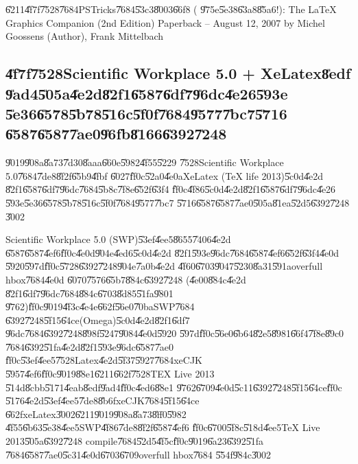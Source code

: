 \bigskip

\U{6211}\U{4f7f}\U{7528}\U{7684}PSTricks\U{7684}\U{53c3}\U{8003}\U{66f8} (%
\U{975e}\U{5e38}\U{63a8}\U{85a6}!): The LaTeX Graphics Companion (2nd
Edition) Paperback -- August 12, 2007 by Michel Goossens (Author), Frank
Mittelbach

\bigskip

\subsection{\U{4f7f}\U{7528}Scientific Workplace 5.0 + XeLatex\U{8edf}%
\U{9ad4}\U{505a}\U{4e2d}\U{82f1}\U{6587}\U{6df7}\U{96dc}\U{4e26}\U{593e}%
\U{5e36}\U{6578}\U{5b78}\U{516c}\U{5f0f}\U{7684}\U{9577}\U{7bc7}\U{5716}%
\U{6587}\U{6587}\U{7ae0}\U{96fb}\U{8166}\U{6392}\U{7248}}

\U{9019}\U{908a}\U{8a73}\U{7d30}\U{8aaa}\U{660e}\U{5982}\U{4f55}\U{5229}%
\U{7528}Scientific Workplace 5.0\U{7684}\U{7de8}\U{8f2f}\U{65b9}\U{4fbf}%
\U{6027}\U{ff0c}\U{52a0}\U{4e0a}XeLatex (TeX life 2013)\U{5c0d}\U{4e2d}%
\U{82f1}\U{6587}\U{6df7}\U{96dc}\U{7684}\U{5b8c}\U{7f8e}\U{652f}\U{63f4}%
\U{ff0c}\U{4f86}\U{5c0d}\U{4e2d}\U{82f1}\U{6587}\U{6df7}\U{96dc}\U{4e26}%
\U{593e}\U{5e36}\U{6578}\U{5b78}\U{516c}\U{5f0f}\U{7684}\U{9577}\U{7bc7}%
\U{5716}\U{6587}\U{6587}\U{7ae0}\U{505a}\U{81ea}\U{52d5}\U{6392}\U{7248}%
\U{3002}

Scientific Workplace 5.0 (SWP)\U{53ef}\U{4ee5}\U{8655}\U{7406}\U{4e2d}%
\U{6587}\U{6587}\U{4ef6}\U{ff0c}\U{4e0d}\U{904e}\U{4ed6}\U{5c0d}\U{4e2d}%
\U{82f1}\U{593e}\U{96dc}\U{7684}\U{6587}\U{4ef6}\U{652f}\U{63f4}\U{4e0d}%
\U{5920}\U{597d}\U{ff0c}\U{5728}\U{6392}\U{7248}\U{904e}\U{7a0b}\U{4e2d}%
\U{4f60}\U{6703}\U{9047}\U{5230}\U{8a31}\U{591a}overfull hbox\U{7684}\U{4e0d}%
\U{6070}\U{7576}\U{65b7}\U{884c}\U{6392}\U{7248} (\U{4e00}\U{884c}\U{4e2d}%
\U{82f1}\U{6df7}\U{96dc}\U{7684}\U{884c}\U{6703}\U{8d85}\U{51fa}\U{9801}%
\U{9762})\U{ff0c}\U{9019}\U{4f3c}\U{4e4e}\U{662f}\U{56e0}\U{70ba}SWP\U{7684}%
\U{6392}\U{7248}\U{5f15}\U{64ce}(Omega)\U{5c0d}\U{4e2d}\U{82f1}\U{6df7}%
\U{96dc}\U{7684}\U{6392}\U{7248}\U{898f}\U{5247}\U{9084}\U{4e0d}\U{5920}%
\U{597d}\U{ff0c}\U{56e0}\U{6b64}\U{82e5}\U{8981}\U{66f4}\U{7f8e}\U{89c0}%
\U{7684}\U{6392}\U{51fa}\U{4e2d}\U{82f1}\U{593e}\U{96dc}\U{6587}\U{7ae0}%
\U{ff0c}\U{53ef}\U{4ee5}\U{7528}Latex\U{4e2d}\U{5f37}\U{5927}\U{7684}xeCJK%
\U{5957}\U{4ef6}\U{ff0c}\U{9019}\U{88e1}\U{6211}\U{662f}\U{7528}TEX Live 2013%
\U{514d}\U{8cbb}\U{5171}\U{4eab}\U{8edf}\U{9ad4}\U{ff0c}\U{4ed6}\U{88e1}%
\U{9762}\U{6709}\U{4e0d}\U{5c11}\U{6392}\U{7248}\U{5f15}\U{64ce}\U{ff0c}%
\U{5176}\U{4e2d}\U{53ef}\U{4ee5}\U{7de8}\U{8b6f}xeCJK\U{7684}\U{5f15}\U{64ce}%
\U{662f}xeLatex\U{3002}\U{6211}\U{9019}\U{908a}\U{8a73}\U{8ff0}\U{5982}%
\U{4f55}\U{6b63}\U{5e38}\U{4ee5}SWP\U{4f86}\U{7de8}\U{8f2f}\U{6587}\U{4ef6}%
\U{ff0c}\U{6700}\U{5f8c}\U{518d}\U{4ee5}TeX Live 2013\U{505a}\U{6392}\U{7248}%
compile\U{7684}\U{52d5}\U{4f5c}\U{ff0c}\U{9019}\U{6a23}\U{6392}\U{51fa}%
\U{7684}\U{6587}\U{7ae0}\U{5c31}\U{4e0d}\U{6703}\U{6709}overfull hbox\U{7684}%
\U{554f}\U{984c}\U{3002}

